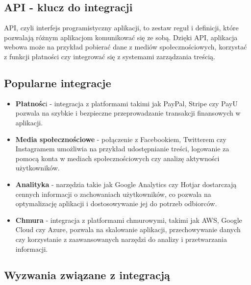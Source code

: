 \subsection{API - klucz do integracji}

API, czyli interfejs programistyczny aplikacji, to zestaw reguł i definicji, które pozwalają różnym aplikacjom komunikować się ze sobą. Dzięki API, aplikacja webowa może na przykład pobierać dane z mediów społecznościowych, korzystać z funkcji płatności czy integrować się z systemami zarządzania treścią\cite{apiIntegration}.

\subsection{Popularne integracje}

\begin{itemize}
\item \textbf{Płatnośc}i - integracja z platformami takimi jak PayPal, Stripe czy PayU pozwala na szybkie i bezpieczne przeprowadzanie transakcji finansowych w aplikacji.
\item \textbf{Media społecznościowe} - połączenie z Facebookiem, Twitterem czy Instagramem umożliwia na przykład udostępnianie treści, logowanie za pomocą konta w mediach społecznościowych czy analizę aktywności użytkowników.
\item \textbf{Analityka} - narzędzia takie jak Google Analytics czy Hotjar dostarczają cennych informacji o zachowaniach użytkowników, co pozwala na optymalizację aplikacji i dostosowywanie jej do potrzeb odbiorców.
\item \textbf{Chmura} - integracja z platformami chmurowymi, takimi jak AWS, Google Cloud czy Azure, pozwala na skalowanie aplikacji, przechowywanie danych czy korzystanie z zaawansowanych narzędzi do analizy i przetwarzania informacji.
\end{itemize}

\subsection{Wyzwania związane z integracją}

